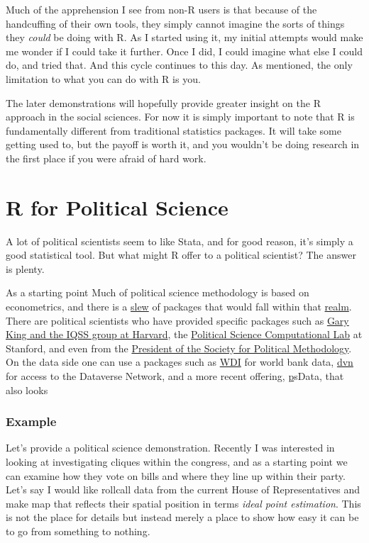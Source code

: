 \documentclass[english,nohyper,titlepage]{tufte-handout}\usepackage[]{graphicx}\usepackage[]{color}
\begin{document}
Much of the apprehension I see from non-R users is that because of the handcuffing of their own tools, they simply cannot imagine the sorts of things they \emph{could} be doing with R.  As I started using it, my initial attempts would make me wonder if I could take it further.  Once I did, I could imagine what else I could do, and tried that. And this cycle continues to this day. As mentioned, the only limitation to what you can do with R is you.

The later demonstrations will hopefully provide greater insight on the R approach in the social sciences.  For now it is simply important to note that R is fundamentally different from traditional statistics packages.  It will take some getting used to, but the payoff is worth it, and you wouldn't be doing research in the first place if you were afraid of hard work.







\part{R for Political Science}
A lot of political scientists seem to like Stata, and for good reason, it's simply a good statistical tool.  But what might R offer to a political scientist?  The answer is plenty.

As a starting point Much of political science methodology is based on econometrics, and there is a \href{http://cran.r-project.org/web/views/Econometrics.html}{slew} of packages that would fall within that \href{http://cran.r-project.org/web/views/SocialSciences.html}{realm}.  There are political scientists who have provided specific packages such as \href{http://datascience.iq.harvard.edu/zelig}{Gary King and the IQSS group at Harvard}, the \href{http://pscl.stanford.edu/}{Political Science Computational Lab} at Stanford, and even from the \href{http://mcmcpack.berkeley.edu/}{President of the Society for Political Methodology}.  On the data side one can use a packages such as \href{http://cran.r-project.org/web/packages/WDI/index.html}{WDI} for world bank data, \href{http://cran.r-project.org/web/packages/dvn/index.html}{dvn} for access to the Dataverse Network, and a more recent offering, \href{http://cran.r-project.org/web/packages/psData/index.html}psData, that also looks 

\section{Example}
Let's provide a political science demonstration.  Recently I was interested in looking at investigating cliques within the congress, and as a starting point we can examine how they vote on bills and where they line up within their party.  Let's say I would like rollcall data from the current House of Representatives and make map that reflects their spatial position in terms \emph{ideal point estimation}.  This is not the place for details but instead merely a place to show how easy it can be to go from something to nothing.
\end{document}
